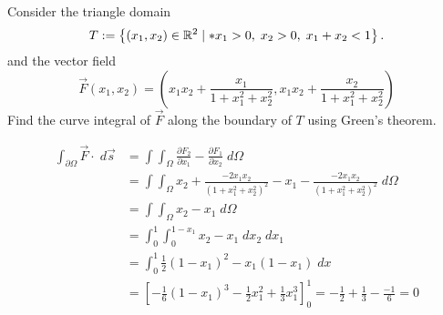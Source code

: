 \documentclass[11pt]{article}
\begin{document}
\begin{exercise}
    Consider the triangle domain 
    \[
        T := \left\{ (x_1,x_2) \in \bbR^{2} \suchthat* x_1 > 0, \; x_2 > 0, \; x_1+x_2 < 1 \right\}.
    \]
    and the vector field 
    \[
        \vec F(x_1,x_2) = \left( x_1x_2 + \frac{x_1}{1+x_1^2+x_2^2}, x_1x_2 + \frac{x_2}{1+x_1^2+x_2^2} \right)
    \]
    Find the curve integral of $\vec F$ along the boundary of $T$ using Green's theorem.
\end{exercise}
\begin{solution}
\begin{align*}
    \int_{\partial \Omega} \vec{F} \cdot \; d \vec{s} &= \int\int_{\Omega} \frac{\partial F_2}{\partial x_1} - \frac{\partial F_1}{\partial x_2}\; d \Omega\\
&= \int\int_{\Omega} x_2 + \frac{-2x_1x_2}{(1+x_1^ 2 + x_2^ 2)^2} - x_1 - \frac{-2x_1x_2}{(1+x_1^ 2 + x_2^ 2)^2} \; d \Omega\\
&= \int\int_{\Omega} x_2  - x_1\; d \Omega\\
&= \int_0^ 1\int_0^ {1-x_1} x_2 - x_1 \;dx_2\;dx_1\\
&= \int_0^ 1 \frac{1}{2}(1-x_1)^ 2 - x_1(1-x_1) \;d x\\
&= \left[ -\frac{1}{6}(1-x_1)^ 3 - \frac{1}{2} x_1^2 + \frac{1}{3}x_1^ 3 \right]_0^1 = -\frac{1}{2} + \frac{1}{3} - \frac{-1}{6} = 0
\end{align*}
\end{solution}
\end{document}
